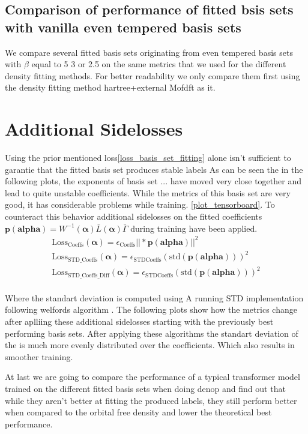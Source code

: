  \subsection{Comparison of performance of fitted bsis sets with vanilla even tempered basis sets}
 We compare several fitted basis sets originating from even tempered basis sets with $\beta$ equal to 5 3 or 2.5 on the same metrics that we used for the different density fitting methods. For better readability we only compare them first using the density fitting method hartree+external Mofdft as it.
 \section{Additional Sidelosses}
 Using the prior mentioned loss\ref{loss_basis_set_fitting} alone isn't sufficient to garantie that the fitted basis set produces stable labels As can be seen the in the following plots, the exponents of basis set ... have moved very close together and lead to quite unstable coefficients. While the metrics of this basis set are very good, it has considerable problems while training. \ref{plot_tensorboard}.
 To counteract this behavior additional sidelosses on the fitted coefficients $\mathbf{p}(\mathbf{alpha}) = W^{-1}(\mathbf{\alpha}) \bar L(\mathbf{\alpha}) \bar \Gamma$ during training have been applied. 
 \begin{align}
    \text{Loss}_\text{Coeffs}(\mathbf{\alpha}) = \epsilon_\text{Coeffs}||*\mathbf{p}(\mathbf{alpha})||^2\\
    \text{Loss}_\text{STD\_Coeffs}(\mathbf{\alpha}) = \epsilon_\text{STDCoeffs}\left(\text{std}(\mathbf{p}(\mathbf{alpha}))\right)^2\\
    \text{Loss}_\text{STD\_Coeffs\_Diff}(\mathbf{\alpha}) = \epsilon_\text{STDCoeffs}\left(\text{std}(\mathbf{p}(\mathbf{alpha}))\right)^2\\
 \end{align}

 Where the standart deviation is computed using A running STD implementation following welfords algorithm \cite{Welford}. 
 The following plots show how the metrics change after aplliing these additional sidelosses starting with the previously best performing basis sets.
 After applying these algorithms the standart deviation of the is much more evenly distributed over the coefficients. 
 Which also results in smoother training.

 At last we are going to compare the performance of a typical transformer model trained on the different fitted basis sets when doing denop and find out that while they aren't better at fitting the produced labels, they still perform better when compared to the orbital free density and lower the theoretical best performance.


